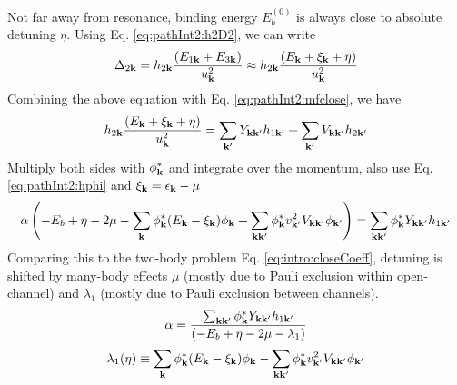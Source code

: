 
Not far away from resonance, binding energy $E_{b}^{(0)}$ is always close to absolute detuning $\eta$.   
Using Eq. \ref{eq:pathInt2:h2D2}, we can write 
\begin{equation*}
\Delta_{2\mathbf{k}}=h_{2\mathbf{k}}\frac{(E_{1\mathbf{k}}+E_{3\mathbf{k}})}{u_{\mathbf{k}}^{2}}\approx{}h_{2\mathbf{k}}\frac{(E_{\mathbf{k}}+\xi_{\mathbf{k}}+\eta)}{u_{\mathbf{k}}^{2}}
\end{equation*}
Combining the above equation with Eq. \ref{eq:pathInt2:mfclose}, we have 
\begin{equation*}
h_{2\mathbf{k}}\frac{(E_{\mathbf{k}}+\xi_{\mathbf{k}}+\eta)}{u_{\mathbf{k}}^{2}}=\sum_{\mathbf{k}'}{}Y_{\mathbf{k}\mathbf{k}'}h_{1\mathbf{k}'}+\sum_{\mathbf{k}'}V_{\mathbf{k}\mathbf{k}'}h_{2\mathbf{k}'}
\end{equation*}
Multiply both sides with $\phi^{*}_{\mathbf{k}}$ and integrate over the momentum, also use Eq. \ref{eq:pathInt2:hphi} and $\xi_{\mathbf{k}}=\epsilon_{\mathbf{k}}-\mu$
\begin{equation}
\alpha\left(-E_{b}+\eta-2\mu-\sum_{\mathbf{k}}{\phi_{\mathbf{k}}^{*}}{(E_{\mathbf{k}}-\xi_{\mathbf{k}})}\phi_{\mathbf{k}}
	+\sum_{\mathbf{k}\mathbf{k}'}{\phi_{\mathbf{k}}^{*}}{v_{\mathbf{k}'}^{2}V_{\mathbf{k}\mathbf{k}'}}\phi_{\mathbf{k}'}\right)
	=\sum_{\mathbf{k}\mathbf{k}'}{\phi_{\mathbf{k}}^{*}}{Y_{\mathbf{k}\mathbf{k}'}}{h_{1\mathbf{k}'}}
\end{equation}
Comparing this to the two-body problem Eq. \ref{eq:intro:closeCoeff}, detuning is shifted by many-body effects $\mu$ (mostly due to Pauli exclusion within open-channel) and $\lambda_{1}$ (mostly due to Pauli exclusion between channels).  
\begin{equation}\label{eq:pathInt2:alpha}
\alpha=\frac{\sum_{\mathbf{k}\mathbf{k}'}{\phi_{\mathbf{k}}^{*}}{Y_{\mathbf{k}\mathbf{k}'}}{h_{1\mathbf{k}'}}}{\left(-E_{b}+\eta-2\mu-\lambda_{1}\right)}
\end{equation}
\begin{equation}\label{eq:pathInt2:lambda1}
\lambda_{1}(\eta)\equiv\sum_{\mathbf{k}}{\phi_{\mathbf{k}}^{*}}{(E_{\mathbf{k}}-\xi_{\mathbf{k}})}\phi_{\mathbf{k}}
	-\sum_{\mathbf{k}\mathbf{k}'}{\phi_{\mathbf{k}}^{*}}{v_{\mathbf{k}'}^{2}V_{\mathbf{k}\mathbf{k}'}}\phi_{\mathbf{k}'}
\end{equation}

